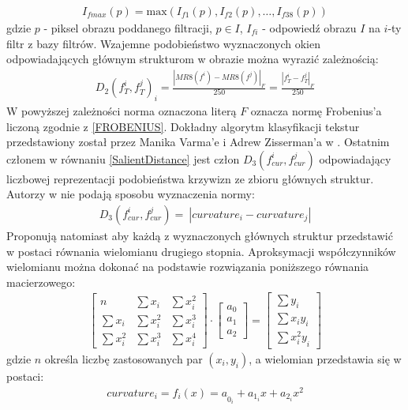 \documentclass[12pt, twoside, openany]{report}
\theoremstyle{definition}
\begin{document}
\begin{align}
I_{fmax}(p)=\mathrm{max}\mathrm{}(I_{f1}(p),I_{f2}(p),\dots ,I_{f38}(p))
\end{align}
gdzie $p$ - piksel obrazu poddanego filtracji, $p\in I$, $I_{fi}$ - odpowiedź obrazu $I$ na $i$-ty filtr z bazy filtrów. Wzajemne podobieństwo wyznaczonych okien odpowiadających głównym strukturom w obrazie można wyrazić zależnością:
\begin{align}
D_2{\left(f^i_T,f^j_T\right)}_i=\frac{{\left|MR8\left(f^i\right)-MR8\left(f^j\right)\right|}_F}{250}=\frac{{\left|f^i_T-f^j_T\right|}_F}{250}
\end{align}
W powyższej zależności norma oznaczona literą $F$ oznacza normę Frobenius'a liczoną zgodnie z \eqref{FROBENIUS}.
Dokładny algorytm klasyfikacji tekstur przedstawiony został przez Manika Varma'e i Adrew Zisserman'a w \cite{varma2009statistical}. Ostatnim członem w równaniu \eqref{SalientDistance} jest człon $D_3\left(f^i_{cur},f^j_{cur}\right)$ odpowiadający liczbowej reprezentacji podobieństwa krzywizn ze zbioru głównych struktur. Autorzy w \cite{SalientStrucTexProp} nie podają sposobu wyznaczenia normy:
\begin{align}
D_3\left(f^i_{cur},f^j_{cur}\right)=\ \left|curvature_i-curvature_j\right|
\end{align}
Proponują natomiast aby każdą z wyznaczonych głównych struktur przedstawić w postaci równania wielomianu drugiego stopnia. Aproksymacji współczynników wielomianu można dokonać na podstawie rozwiązania poniższego równania macierzowego:
\begin{align}
\left[ \begin{array}{ccc}
n & \sum{x_i} & \sum{x^2_i} \\ 
\sum{x_i} & \sum{x^2_i} & \sum{x^3_i} \\ 
\sum{x^2_i} & \sum{x^3_i} & \sum{x^4_i} \end{array}
\right]\cdot \left[ \begin{array}{c}
a_0 \\ 
a_1 \\ 
a_2 \end{array}
\right]=\left[ \begin{array}{c}
\sum{y_i} \\ 
\sum{x_iy_i} \\ 
\sum{{x^2_iy}_i} \end{array}
\right]
\end{align}
gdzie $n$ określa liczbę zastosowanych par $(x_i,y_i)$, a wielomian przedstawia się w postaci:
\begin{align}
curvature_i={f_i\left(x\right)=a}_{0_i}+a_{1_i}x+a_{2_i}x^2
\end{align}
\end{document}
